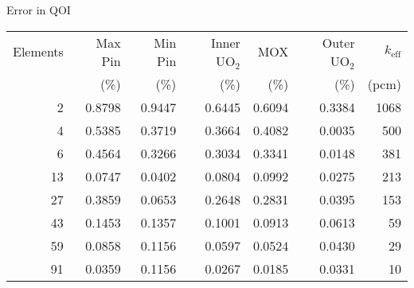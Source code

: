 \documentclass[compress,10pt]{beamer}
\newcommand{\keff}{\ensuremath{{k_\mathrm{eff}}}}
\begin{document}
\begin{frame}
    {\small Error in QOI} \\
    { \scriptsize
    \begin{tabular}{rrrrrrr}
        \hline
        Elements & Max Pin & Min Pin & Inner UO$_2$ & MOX  & Outer UO$_2$ & \keff \\
                 & (\%)    & (\%)    & (\%)         & (\%) & (\%)         & (pcm) \\ \hline \hline
        2 & 0.8798 & 0.9447 & 0.6445 & 0.6094 & 0.3384 & 1068 \\ \hline
        4 & 0.5385 & 0.3719 & 0.3664 & 0.4082 & 0.0035 & 500 \\ \hline
        6 & 0.4564 & 0.3266 & 0.3034 & 0.3341 & 0.0148 & 381 \\ \hline
        13 & 0.0747 & 0.0402 & 0.0804 & 0.0992 & 0.0275 & 213 \\ \hline
        27 & 0.3859 & 0.0653 & 0.2648 & 0.2831 & 0.0395 & 153 \\ \hline
        43 & 0.1453 & 0.1357 & 0.1001 & 0.0913 & 0.0613 & 59 \\ \hline
        59 & 0.0858 & 0.1156 & 0.0597 & 0.0524 & 0.0430 & 29 \\ \hline
        91 & 0.0359 & 0.1156 & 0.0267 & 0.0185 & 0.0331 & 10 \\ \hline
    \end{tabular}
    }

\end{frame}

\typeout{***********************************************************************************}
\end{document}
